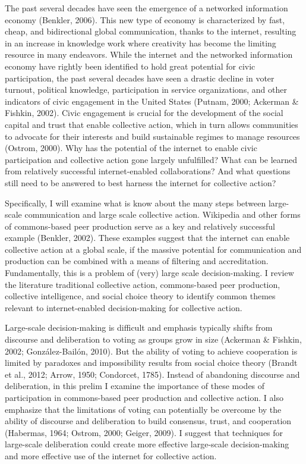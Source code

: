 The past several decades have seen the emergence of a networked information economy (Benkler, 2006). This new type of economy is characterized by fast, cheap, and bidirectional global communication, thanks to the internet, resulting in an increase in knowledge work where creativity has become the limiting resource in many endeavors. While the internet and the networked information economy have rightly been identified to hold great potential for civic participation, the past several decades have seen a drastic decline in voter turnout, political knowledge, participation in service organizations, and other indicators of civic engagement in the United States (Putnam, 2000; Ackerman \& Fishkin, 2002). Civic engagement is crucial for the development of the social capital and trust that enable collective action, which in turn allows communities to advocate for their interests and build sustainable regimes to manage resources (Ostrom, 2000). Why has the potential of the internet to enable civic participation and collective action gone largely unfulfilled? What can be learned from relatively successful internet-enabled collaborations? And what questions still need to be answered to best harness the internet for collective action?

Specifically, I will examine what is know about the many steps between large-scale communication and large scale collective action. Wikipedia and other forms of commons-based peer production serve as a key and relatively successful example (Benkler, 2002). These examples suggest that the internet can enable collective action at a global scale, if the massive potential for communication and production can be combined with a means of filtering and accreditation. Fundamentally, this is a problem of (very) large scale decision-making. I review the literature traditional collective action, commons-based peer production, collective intelligence, and social choice theory to identify common themes relevant to internet-enabled decision-making for collective action.

Large-scale decision-making is difficult and emphasis typically shifts from discourse and deliberation to voting as groups grow in size (Ackerman \& Fishkin, 2002; Gonz\'alez-Bail\'on, 2010). But the ability of voting to achieve cooperation is limited by paradoxes and impossibility results from social choice theory (Brandt et al., 2012; Arrow, 1950; Condorcet, 1785). Instead of abandoning discourse and deliberation, in this prelim I examine the importance of these modes of participation in commons-based peer production and collective action. I also emphasize that the limitations of voting can potentially be overcome by the ability of discourse and deliberation to build consensus, trust, and cooperation (Habermas, 1964; Ostrom, 2000; Geiger, 2009). I suggest that techniques for large-scale deliberation could create more effective large-scale decision-making and more effective use of the internet for collective action.

